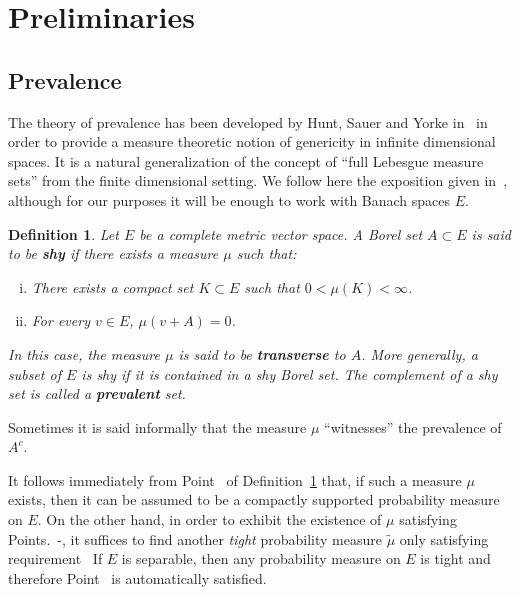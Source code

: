 \documentclass[11pt,oneside,reqno]{amsart}
\newcommand{\tmdfn}[1]{\textbf{#1}}
\newcommand{\tmem}[1]{{\em #1\/}}
\newcommand{\tmtextit}[1]{\text{{\itshape{#1}}}}
\newenvironment{enumerateroman}{\begin{enumerate}[i.] }{\end{enumerate}}
\newtheorem{definition}[theorem]{Definition}
\numberwithin{equation}{section}
\begin{document}
\section{Preliminaries}\label{sec:preliminaries}

\subsection{Prevalence}\label{sec:prevalence}

The theory of prevalence has been developed by Hunt, Sauer and Yorke
in~{\cite{huntsauer}} in order to provide a measure theoretic notion of
genericity in infinite dimensional spaces. It is a natural generalization of
the concept of ``full Lebesgue measure sets'' from the finite dimensional
setting. We follow here the exposition given in~{\cite{huntsauer}}, although
for our purposes it will be enough to work with Banach spaces $E$.

\begin{definition}
  \label{def:prevalence}Let $E$ be a complete metric vector space. A Borel set
  $A \subset E$ is said to be {\tmdfn{shy}} if there exists a measure $\mu$
  such that:
  \begin{enumerateroman}
    \item There exists a compact set $K \subset E$ such that $0 < \mu (K) <
    \infty$.
    
    \item For every $v \in E$, $\mu (v + A) = 0$.
  \end{enumerateroman}
  In this case, the measure $\mu$ is said to be {\tmdfn{transverse}} to $A$.
  More generally, a subset of $E$ is shy if it is contained in a shy Borel
  set. The complement of a shy set is called a {\tmdfn{prevalent}} set.
\end{definition}

Sometimes it is said informally that the measure $\mu$ ``witnesses'' the
prevalence of $A^c$.

It follows immediately from Point~\tmtextit{i.} of
Definition~\ref{def:prevalence} that, if such a measure $\mu$
exists, then it can be assumed to be a compactly supported probability measure
on $E$. On the other hand, in order to exhibit the existence of $\mu$
satisfying Points.~\tmtextit{i.}-\tmtextit{ii.}, it suffices to find another
{\tmem{tight}} probability measure $\tilde{\mu}$ only satisfying
requirement~\tmtextit{ii.} If $E$ is separable, then any probability measure
on $E$ is tight and therefore Point~\tmtextit{i.} is automatically satisfied.
\end{document}
